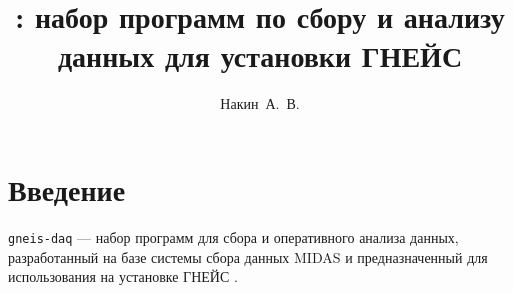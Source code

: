 \documentclass[12pt, a4paper]{book}
\title{\GD{}: набор программ по сбору и анализу данных для установки ГНЕЙС}
\author{Накин~А.~В.}
\newcommand{\GD}{{\tt gneis-daq}}
\begin{document}
\maketitle

\chapter{Введение}

\GD{} --- набор программ для сбора и оперативного анализа данных, разработанный  на базе системы сбора данных MIDAS \cite{midas} и предназначенный для использования на установке ГНЕЙС \cite{shcherb2018}.

\printbibliography
\end{document}
